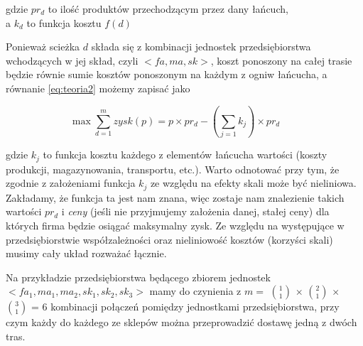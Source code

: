 \documentclass[polish, twoside, 12pt, a4paper]{article}
\theoremstyle{definition}
\theoremstyle{plain}
\theoremstyle{remark}
\begin{document}
\begin{center}
  gdzie $pr_d$ to ilość produktów przechodzącym przez dany łańcuch, \\ 
  a $k_d$ to funkcja kosztu $f(d)$
\end{center}

Ponieważ scieżka $d$ składa się z kombinacji jednostek przedsiębiorstwa wchodzących w jej skład, czyli $<fa,ma,sk>$, koszt ponoszony na całej trasie będzie równie sumie kosztów ponoszonym na każdym z ogniw łańcucha, a równanie \ref{eq:teoria2} możemy zapisać jako

\begin{equation} \label{eq:teoria3}
\max \sum\limits_{d=1}^m  zysk(p) = 
p \times pr_d -  ( \sum\limits_{j=1} k_j) \times pr_d \qquad 
\end{equation}

gdzie $ k_j$ to funkcja kosztu każdego z elementów łańcucha wartości (koszty produkcji, magazynowania, transportu, etc.). Warto odnotować przy tym, że zgodnie z założeniami funkcja $k_j$ ze względu na efekty skali może być nieliniowa. Zakładamy, że funkcja ta jest nam znana, więc zostaje nam znalezienie takich wartości $pr_d$ i \textit{ceny} (jeśli nie przyjmujemy założenia danej, stałej ceny) dla których firma będzie osiągać maksymalny zysk. Ze względu na występujące w przedsiębiorstwie współzależności oraz nieliniowość kosztów (korzyści skali) musimy cały układ rozważać łącznie. 

Na przykładzie przedsiębiorstwa będącego zbiorem jednostek $<fa_1, ma_1, ma_2, sk_1, sk_2, sk_3>$ mamy do czynienia z $m= $ $1\choose 1 $ $ \times $ $2\choose 1 $ $ \times $ $3\choose 1 $ = 6 kombinacji połączeń pomiędzy jednostkami przedsiębiorstwa, przy czym każdy do każdego ze sklepów można przeprowadzić dostawę jedną z dwóch tras. \\ 
\end{document}
